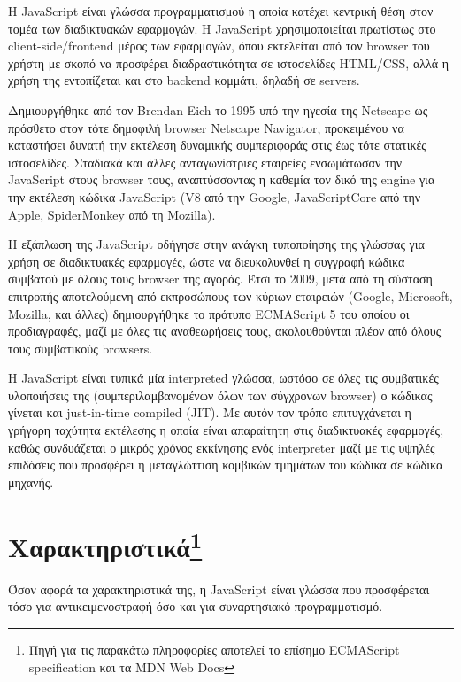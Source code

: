 \documentclass[../thesis.tex]{subfiles}
\begin{document}
Η JavaScript είναι γλώσσα προγραμματισμού η οποία κατέχει κεντρική θέση στον τομέα των διαδικτυακών εφαρμογών.
Η JavaScript χρησιμοποιείται πρωτίστως στο client-side/frontend μέρος των εφαρμογών, όπου εκτελείται από τον browser του χρήστη με σκοπό να προσφέρει διαδραστικότητα σε ιστοσελίδες HTML/CSS, αλλά η χρήση της εντοπίζεται και στο backend κομμάτι, δηλαδή σε servers.

\bigskip

Δημιουργήθηκε από τον Brendan Eich το 1995 υπό την ηγεσία της Netscape ως πρόσθετο στον τότε δημοφιλή browser Netscape Navigator, προκειμένου να καταστήσει δυνατή την εκτέλεση δυναμικής συμπεριφοράς στις έως τότε στατικές ιστοσελίδες\cite{10.1145/3386327}.
Σταδιακά και άλλες ανταγωνίστριες εταιρείες ενσωμάτωσαν την JavaScript στους browser τους, αναπτύσσοντας η καθεμία τον δικό της engine για την εκτέλεση κώδικα JavaScript (V8 από την Google, JavaScriptCore από την Apple, SpiderMonkey από τη Mozilla).

Η εξάπλωση της JavaScript οδήγησε στην ανάγκη τυποποίησης της γλώσσας για χρήση σε διαδικτυακές εφαρμογές, ώστε να διευκολυνθεί η συγγραφή κώδικα συμβατού με όλους τους browser της αγοράς.
Έτσι το 2009, μετά από τη σύσταση επιτροπής αποτελούμενη από εκπροσώπους των κύριων εταιρειών (Google, Microsoft, Mozilla, και άλλες) δημιουργήθηκε το πρότυπο ECMAScript 5 του οποίου οι προδιαγραφές, μαζί με όλες τις αναθεωρήσεις τους, ακολουθούνται πλέον από όλους τους συμβατικούς browsers.

\bigskip

Η JavaScript είναι τυπικά μία interpreted γλώσσα, ωστόσο σε όλες τις συμβατικές υλοποιήσεις της (συμπεριλαμβανομένων όλων των σύγχρονων browser) ο κώδικας γίνεται και just-in-time compiled (JIT).
Με αυτόν τον τρόπο επιτυγχάνεται η γρήγορη ταχύτητα εκτέλεσης η οποία είναι απαραίτητη στις διαδικτυακές εφαρμογές, καθώς συνδυάζεται ο μικρός χρόνος εκκίνησης ενός interpreter μαζί με τις υψηλές επιδόσεις που προσφέρει η μεταγλώττιση κομβικών τμημάτων του κώδικα σε κώδικα μηχανής.

\section[Χαρακτηριστικά]{Χαρακτηριστικά\footnote{Πηγή για τις παρακάτω πληροφορίες αποτελεί το επίσημο ECMAScript specification\cite{ecmascript} και τα MDN Web Docs\cite{jsMozilla}}}

Όσον αφορά τα χαρακτηριστικά της, η JavaScript είναι γλώσσα που προσφέρεται τόσο για αντικειμενοστραφή όσο και για συναρτησιακό προγραμματισμό.
\end{document}
